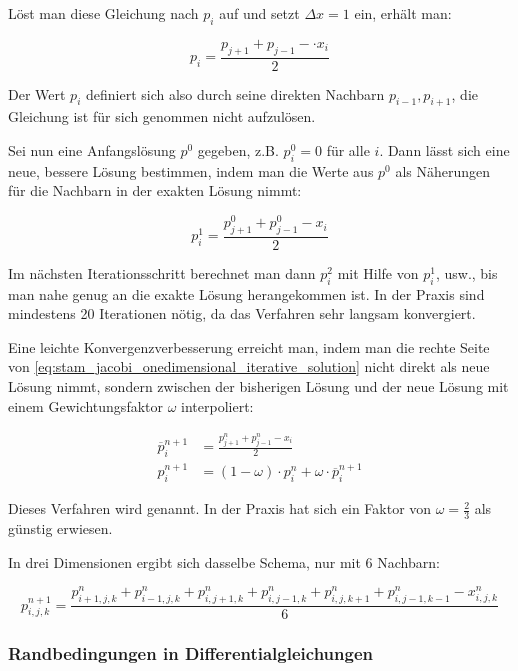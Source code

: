 Löst man diese Gleichung nach $p_i$ auf und setzt $\Delta x = 1$ ein, erhält
man:

\begin{equation}
p_i
=
\frac{
	p_{j+1} +
	p_{j-1} -
	\cdot x_i
}
{
	2
}
\end{equation}

Der Wert $p_i$ definiert sich also durch seine direkten Nachbarn $p_{i-1},
p_{i+1}$, die Gleichung ist für sich genommen nicht aufzulösen.

Sei nun eine Anfangslösung $p^0$ gegeben, z.B. $p^0_i = 0$ für alle $i$.
Dann lässt sich eine neue, bessere Lösung bestimmen, indem man die Werte aus
$p^0$ als Näherungen für die Nachbarn in der exakten Lösung nimmt:

\begin{equation}
\label{eq:stam_jacobi_onedimensional_iterative_solution}
p_i^1
=
\frac{
	p_{j+1}^{0} + p_{j-1}^{0} - x_i
}
{
	2
}
\end{equation}

Im nächsten Iterationsschritt berechnet man dann $p_i^2$ mit Hilfe von $p_i^1$,
usw., bis man nahe genug an die exakte Lösung herangekommen ist. In der Praxis
sind mindestens 20 Iterationen nötig, da das Verfahren sehr langsam konvergiert.

Eine leichte Konvergenzverbesserung erreicht man, indem man die rechte Seite von
\autoref{eq:stam_jacobi_onedimensional_iterative_solution} nicht direkt als neue
Lösung nimmt, sondern zwischen der bisherigen Lösung und der neue Lösung mit
einem Gewichtungsfaktor $\omega$ interpoliert:

\begin{align}
\overline{p}_i^{n+1}
&=
\frac{
	p_{j+1}^{n} + p_{j-1}^{n} - x_i
}
{
	2
} \\
p_i^{n+1}
&=
(1-\omega) \cdot p_i^n + \omega \cdot \overline{p}_i^{n+1}
\end{align}

Dieses Verfahren wird  genannt. In
der Praxis hat sich ein Faktor von $\omega=\frac{2}{3}$ als günstig erwiesen.

In drei Dimensionen ergibt sich dasselbe Schema, nur mit 6 Nachbarn:

\begin{equation*}
p_{i,j,k}^{n+1}
=
\frac{
	p_{i+1,j,k}^n +
	p_{i-1,j,k}^n +
	p_{i,j+1,k}^n +
	p_{i,j-1,k}^n +
	p_{i,j,k+1}^n +
	p_{i,j-1,k-1}^n -
	x_{i,j,k}^n
}
{
	6
}
\end{equation*}

\subsubsection{Randbedingungen in Differentialgleichungen}

